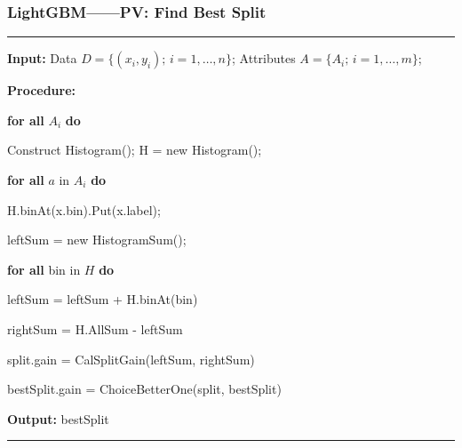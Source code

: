 \documentclass[usenames,dvipsnames]{beamer}
\begin{document}
\begin{frame}
\frametitle{LightGBM——PV: Find Best Split}
\noindent\rule[0.10\baselineskip]{\textwidth}{0.75pt}
  \textbf{Input:} Data $D=\{(x_i,y_i);\, i = 1,\dots, n\}$; Attributes $A = \{A_i;\,i=1,\dots,m\}$;\par
  \textbf{Procedure:}\par
  \hspace*{32pt} \textbf{for all} $A_i$ \textbf{do}\par
  \hspace*{48pt}  Construct Histogram(); H = new Histogram();\par
  \hspace*{48pt}  \textbf{for all} $a$ in $A_i$ \textbf{do}\par
  \hspace*{64pt}  H.binAt(x.bin).Put(x.label);\par
  \hspace*{48pt}  leftSum = new HistogramSum();\par
  \hspace*{48pt}  \textbf{for all} bin in $H$ \textbf{do}\par
  \hspace*{64pt}  leftSum = leftSum + H.binAt(bin)\par
  \hspace*{64pt}  rightSum = H.AllSum - leftSum\par
  \hspace*{64pt}  split.gain = CalSplitGain(leftSum, rightSum)\par
  \hspace*{64pt}  bestSplit.gain = ChoiceBetterOne(split, bestSplit)\par
  \textbf{Output:} bestSplit\par
\noindent\rule[0.10\baselineskip]{\textwidth}{0.75pt}
\end{frame}
\end{document}
